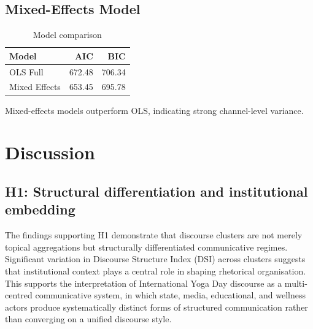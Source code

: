 \documentclass[11pt]{article}
\begin{document}
\subsection{Mixed-Effects Model}



\begin{table}[H]

\centering

\begin{tabular}{lrr}

\toprule

Model & AIC & BIC \\

\midrule

OLS Full & 672.48 & 706.34 \\

Mixed Effects & 653.45 & 695.78 \\

\bottomrule

\end{tabular}

\caption{Model comparison}

\end{table}



Mixed-effects models outperform OLS, indicating strong channel-level variance.



\section{Discussion}

\subsection{H1: Structural differentiation and institutional embedding}

The findings supporting H1 demonstrate that discourse clusters are not merely topical 
aggregations but structurally differentiated communicative regimes. Significant variation 
in Discourse Structure Index (DSI) across clusters suggests that institutional context 
plays a central role in shaping rhetorical organisation. This supports the interpretation of 
International Yoga Day discourse as a multi-centred communicative system, in which state, media, 
educational, and wellness actors produce systematically distinct forms of structured communication 
rather than converging on a unified discourse style.
\end{document}
